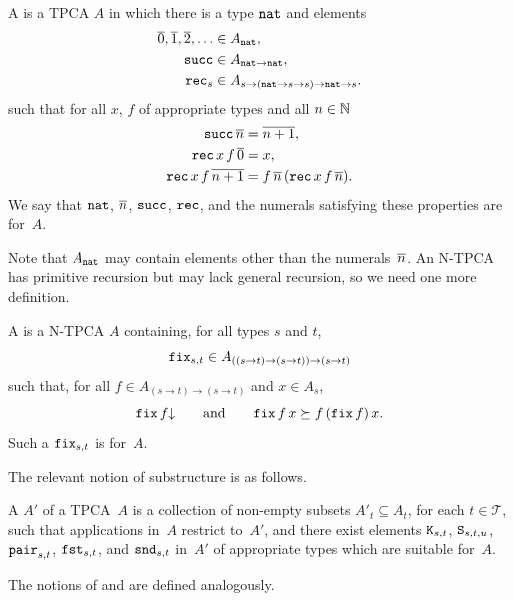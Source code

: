 \begin{definition}
  A  is a TPCA $A$ in which there is a
  type $\mathtt{nat}$ and elements
  \begin{align*}
    \overline{0}, \overline{1}, \overline{2}, \ldots &\in A_{\mathtt{nat}}, \\
    \mathtt{succ} &\in A_{\mathtt{nat} \to \mathtt{nat}}, \\
    \mathtt{rec}_s &\in A_{s \to (\mathtt{nat} \to s \to s) \to \mathtt{nat} \to s}.
  \end{align*}
  such that for all $x$, $f$ of appropriate types and all $n \in \mathbb{N}$
  \begin{align*}
    \mathtt{succ} \, \overline{n} &= \overline{n + 1}, \\
    \mathtt{rec} \, x \, f \, \overline{0} &= x, \\
    \mathtt{rec} \, x \, f \, \overline{n+1} &=
                                          f \, \overline{n} \, (\mathtt{rec} \, x \, f \, \overline{n}).
  \end{align*}
  We say that $\mathtt{nat}$, $\overline{n}$, $\mathtt{succ}$, $\mathtt{rec}$, and the numerals satisfying these properties are  for~$A$.
\end{definition}

Note that $A_{\mathtt{nat}}$ may contain elements other than the numerals~$\overline{n}$.
An N-TPCA has primitive recursion but may lack general recursion, so we need one more definition.

\begin{definition}
  A  is a
  N-TPCA $A$ containing, for all types $s$ and $t$,
  \begin{equation*}
    \mathtt{fix}_{s,t} \in A_{((s \to t) \to (s \to t)) \to (s \to t)}
  \end{equation*}
  such that, for all $f \in A_{(s \to t) \to (s \to t)}$ and $x \in A_s$,
  \begin{equation*}
    \mathtt{fix} \, f{\downarrow}
    \qquad\text{and}\qquad
    \mathtt{fix} \, f \, x \succeq f \, (\mathtt{fix}\, f) \, x.
  \end{equation*}
  Such a $\mathtt{fix}_{s,t}$ is  for~$A$.
\end{definition}

The relevant notion of substructure is as follows.

\begin{definition}
  A  $A'$ of a TPCA~$A$ is a collection of non-empty
  subsets $A'_t \subseteq A_t$, for each $t \in \mathcal{T}$, such that
  applications in~$A$ restrict to~$A'$, and there exist elements
  $\mathtt{K}_{s,t}$, $\mathtt{S}_{s,t,u}$, $\mathtt{pair}_{s,t}$, $\mathtt{fst}_{s,t}$,
  and $\mathtt{snd}_{s,t}$ in~$A'$ of
  appropriate types which are suitable for~$A$.

  The notions of 
  and  are defined analogously.
\end{definition}

